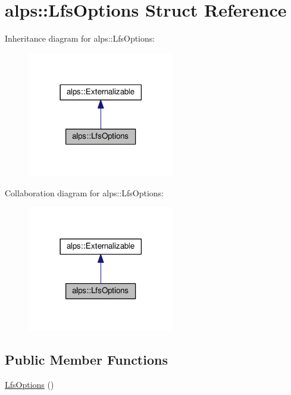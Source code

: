 \hypertarget{structalps_1_1LfsOptions}{}\section{alps\+:\+:Lfs\+Options Struct Reference}
\label{structalps_1_1LfsOptions}


Inheritance diagram for alps\+:\+:Lfs\+Options\+:
\nopagebreak
\begin{figure}[H]
\begin{center}
\leavevmode
\includegraphics[width=182pt]{structalps_1_1LfsOptions__inherit__graph}
\end{center}
\end{figure}


Collaboration diagram for alps\+:\+:Lfs\+Options\+:
\nopagebreak
\begin{figure}[H]
\begin{center}
\leavevmode
\includegraphics[width=182pt]{structalps_1_1LfsOptions__coll__graph}
\end{center}
\end{figure}
\subsection*{Public Member Functions}
\begin{DoxyCompactItemize}
\item 
\hyperlink{structalps_1_1LfsOptions_af7489183e0149dbf8a9fa7e827f49c60}{Lfs\+Options} ()
\end{DoxyCompactItemize}
